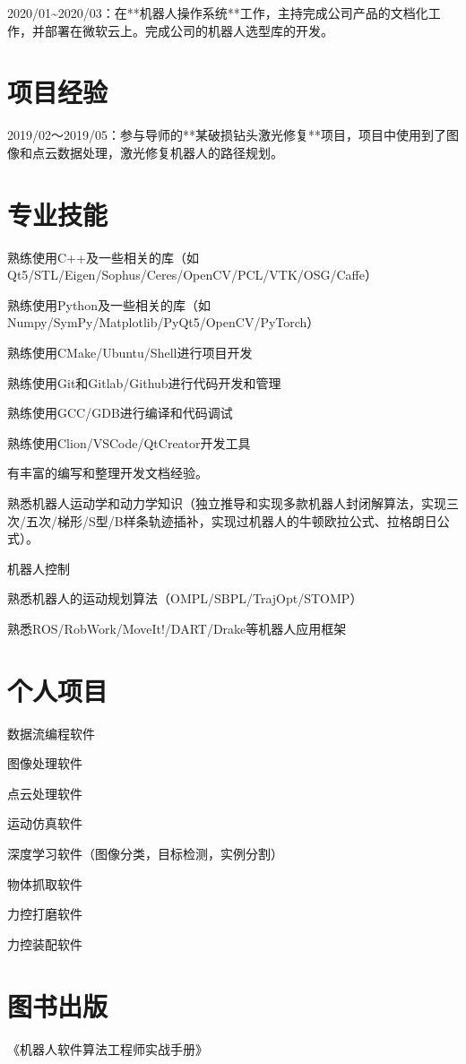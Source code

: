 \documentclass[letterpaper,10pt,english]{sphinxmanual}
\begin{document}
2020/01\textasciitilde{}2020/03：在**机器人操作系统**工作，主持完成公司产品的文档化工作，并部署在微软云上。完成公司的机器人选型库的开发。


\section{项目经验}
\label{\detokenize{resume:id7}}
2019/02～2019/05：参与导师的**某破损钻头激光修复**项目，项目中使用到了图像和点云数据处理，激光修复机器人的路径规划。


\section{专业技能}
\label{\detokenize{resume:id8}}
熟练使用C++及一些相关的库（如Qt5/STL/Eigen/Sophus/Ceres/OpenCV/PCL/VTK/OSG/Caffe）

熟练使用Python及一些相关的库（如Numpy/SymPy/Matplotlib/PyQt5/OpenCV/PyTorch）

熟练使用CMake/Ubuntu/Shell进行项目开发

熟练使用Git和Gitlab/Github进行代码开发和管理

熟练使用GCC/GDB进行编译和代码调试

熟练使用Clion/VSCode/QtCreator开发工具

有丰富的编写和整理开发文档经验。

熟悉机器人运动学和动力学知识（独立推导和实现多款机器人封闭解算法，实现三次/五次/梯形/S型/B样条轨迹插补，实现过机器人的牛顿\sphinxhyphen{}欧拉公式、拉格朗日公式）。

机器人控制

熟悉机器人的运动规划算法（OMPL/SBPL/TrajOpt/STOMP）

熟悉ROS/RobWork/MoveIt!/DART/Drake等机器人应用框架


\section{个人项目}
\label{\detokenize{resume:id9}}
数据流编程软件

图像处理软件

点云处理软件

运动仿真软件

深度学习软件（图像分类，目标检测，实例分割）

物体抓取软件

力控打磨软件

力控装配软件


\section{图书出版}
\label{\detokenize{resume:id10}}
《机器人软件算法工程师实战手册》
\end{document}
